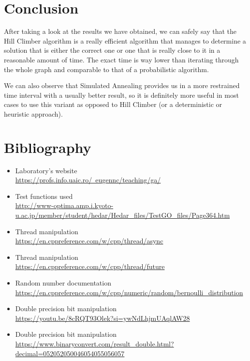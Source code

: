 \documentclass{article}
\begin{document}
\newpage
\section{Conclusion}

After taking a look at the results we have obtained, we can safely say that the Hill Climber algorithm is a really efficient algorithm that manages to determine a solution that is either the correct one or one that is really close to it in a reasonable amount of time. The exact time is way lower than iterating through the whole graph and comparable to that of a probabilistic algorithm.

We can also observe that Simulated Annealing provides us in a more restrained time interval with a usually better result, so it is definitely more useful in most cases to use this variant as opposed to Hill Climber (or a deterministic or heuristic approach).  

\section{Bibliography}

\begin{itemize}
\item Laboratory’s website \\
\href{URL}{https://profs.info.uaic.ro/~eugennc/teaching/ga/}
\item Test functions used \\
\href{URL}{http://www-optima.amp.i.kyoto-u.ac.jp/member/student/hedar/Hedar_files/TestGO_files/Page364.htm}

\item Thread manipulation \\
\href{URL}{https://en.cppreference.com/w/cpp/thread/async}
\item Thread manipulation \\
\href{URL}{https://en.cppreference.com/w/cpp/thread/future} 

\item Random number documentation \\
\href{URL}{https://en.cppreference.com/w/cpp/numeric/random/bernoulli_distribution}
\item Double precision bit manipulation \\
\href{URL}{https://youtu.be/8cRQT93Olek?si=ywNdLhjmUAqlAW28}
\item Double precision bit manipulation \\
\href{URL}{https://www.binaryconvert.com/result_double.html?decimal=052052050046054055056057}

\end{itemize}
\end{document}
